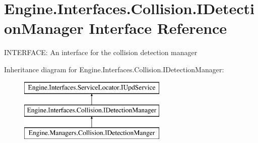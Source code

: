 \hypertarget{a00430}{}\section{Engine.\+Interfaces.\+Collision.\+I\+Detection\+Manager Interface Reference}
\label{a00430}


I\+N\+T\+E\+R\+F\+A\+CE\+: An interface for the collision detection manager  


Inheritance diagram for Engine.\+Interfaces.\+Collision.\+I\+Detection\+Manager\+:\begin{figure}[H]
\begin{center}
\leavevmode
\includegraphics[height=3.000000cm]{dc/d0c/a00430}
\end{center}
\end{figure}
